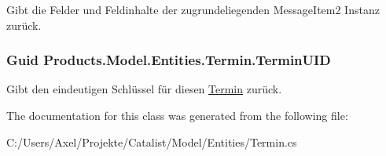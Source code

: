 Gibt die Felder und Feldinhalte der zugrundeliegenden Message\+Item2 Instanz zurück. 

\subsubsection[{\texorpdfstring{Termin\+U\+ID}{TerminUID}}]{\setlength{\rightskip}{0pt plus 5cm}Guid Products.\+Model.\+Entities.\+Termin.\+Termin\+U\+ID\hspace{0.3cm}{\ttfamily [get]}}\hypertarget{class_products_1_1_model_1_1_entities_1_1_termin_a0543b47f7fa008e2116c5ec447263834}{}\label{class_products_1_1_model_1_1_entities_1_1_termin_a0543b47f7fa008e2116c5ec447263834}


Gibt den eindeutigen Schlüssel für diesen \hyperlink{class_products_1_1_model_1_1_entities_1_1_termin}{Termin} zurück. 



The documentation for this class was generated from the following file\+:\begin{DoxyCompactItemize}
\item 
C\+:/\+Users/\+Axel/\+Projekte/\+Catalist/\+Model/\+Entities/Termin.\+cs\end{DoxyCompactItemize}
